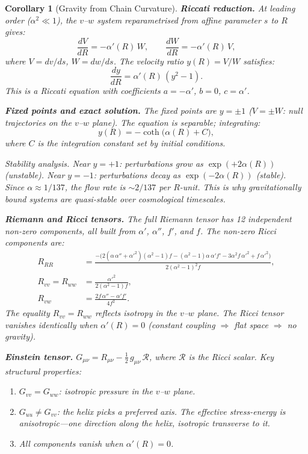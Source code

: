 \documentclass[12pt]{amsart}
\newtheorem{corollary}{Corollary}
\begin{document}
\begin{corollary}[Gravity from Chain Curvature]
\medskip
\textbf{Riccati reduction.}  At leading order ($\alpha^2 \ll 1$), the $v$--$w$ system
reparametrised from affine parameter $s$ to $R$ gives:
\[
  \frac{dV}{dR} = -\alpha'(R)\, W, \qquad
  \frac{dW}{dR} = -\alpha'(R)\, V,
\]
where $V = dv/ds$, $W = dw/ds$.  The velocity ratio $y(R) = V/W$ satisfies:
\[
  \boxed{\frac{dy}{dR} = \alpha'(R)\, (y^2 - 1).}
\]
This is a Riccati equation with coefficients $a = -\alpha'$, $b = 0$, $c = \alpha'$.

\medskip
\textbf{Fixed points and exact solution.}  The fixed points are $y = \pm 1$
($V = \pm W$: null trajectories on the $v$--$w$ plane).  The equation is separable;
integrating:
\[
  y(R) = -\coth\!\bigl(\alpha(R) + C\bigr),
\]
where $C$ is the integration constant set by initial conditions.

\textit{Stability analysis.}  Near $y = +1$: perturbations grow as $\exp(+2\alpha(R))$
(unstable).  Near $y = -1$: perturbations decay as $\exp(-2\alpha(R))$ (stable).
Since $\alpha \approx 1/137$, the flow rate is $\sim 2/137$ per $R$-unit.  This is why
gravitationally bound systems are quasi-stable over cosmological timescales.

\medskip
\textbf{Riemann and Ricci tensors.}  The full Riemann tensor has 12 independent
non-zero components, all built from $\alpha'$, $\alpha''$, $f'$, and $f$.  The non-zero
Ricci components are:
\begin{align}
  R_{RR} &= \frac{-\bigl(2(\alpha\, \alpha'' + \alpha'^2)(\alpha^2 - 1) f
    - (\alpha^2 - 1)\alpha\, \alpha' f'
    - 3\alpha^2 f\, \alpha'^2 + f\, \alpha'^2\bigr)}{2(\alpha^2 - 1)^2 f}, \\[4pt]
  R_{vv} = R_{ww} &= \frac{\alpha'^2}{2(\alpha^2 - 1) f}, \\[4pt]
  R_{vw} &= \frac{2f\, \alpha'' - \alpha' f'}{4f^2}.
\end{align}
The equality $R_{vv} = R_{ww}$ reflects isotropy in the $v$--$w$ plane.  The Ricci
tensor vanishes identically when $\alpha'(R) = 0$ (constant coupling $\Rightarrow$
flat space $\Rightarrow$ no gravity).

\medskip
\textbf{Einstein tensor.}  $G_{\mu\nu} = R_{\mu\nu} - \tfrac{1}{2}\, g_{\mu\nu}\, \mathcal{R}$,
where $\mathcal{R}$ is the Ricci scalar.  Key structural properties:
\begin{enumerate}
\item $G_{vv} = G_{ww}$: isotropic pressure in the $v$--$w$ plane.
\item $G_{uu} \ne G_{vv}$: the helix picks a preferred axis.  The effective
      stress-energy is anisotropic---one direction along the helix, isotropic
      transverse to it.
\item All components vanish when $\alpha'(R) = 0$.
\end{enumerate}


\end{corollary}
\end{document}
